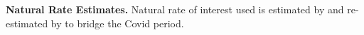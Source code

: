 \documentclass[12pt]{article}
\numberwithin{equation}{section}
\begin{document}
\noindent\textbf{Natural Rate Estimates.}
Natural rate of interest used is estimated by \citet{LW2003} and re-estimated by \citet{HLW2023} to bridge the Covid period.







\end{document}
